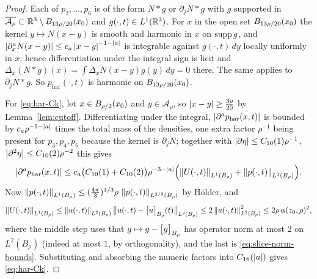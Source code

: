 \documentclass[11pt,reqno]{amsart}
\begin{document}
\begin{proof}
Each of $p_{2},\dots,p_{6}$ is of the form $N*g$ or $\partial_{j}N*g$ with $g$
supported in $\overline{\mathcal{A}_{\rho}}\subset\mathbb{R}^{3}\setminus B_{13\rho/20}(x_{0})$
and $g(\cdot,t)\in L^{1}(\mathbb{R}^{3})$. For $x$ in the open set
$B_{13\rho/20}(x_{0})$ the kernel $y\mapsto N(x-y)$ is smooth and harmonic in
$x$ on $\operatorname{supp} g$, and $\left\lvert \partial_{x}^{a}N(x-y) \right\rvert\le c_{a}\left\lvert x-y \right\rvert^{-1-\left\lvert a \right\rvert}$
is integrable against $g(\cdot,t)\,dy$ locally uniformly in $x$; hence
differentiation under the integral sign is licit and
$\Delta_{x}(N*g)(x)=\int\Delta_{x}N(x-y)g(y)\,dy=0$ there. The same applies to
$\partial_{j}N*g$. So $p_{\mathrm{har}}(\cdot,t)$ is harmonic on
$B_{13\rho/20}(x_{0})$.

For \eqref{eq:har-Ck}, let $x\in B_{\rho/2}(x_{0})$ and
$y\in\mathcal{A}_{\rho}$, so $\left\lvert x-y \right\rvert\ge\tfrac{3\rho}{20}$ by
Lemma~\ref{lem:cutoff}. Differentiating under the integral,
$\left\lvert \partial^{a}p_{\mathrm{har}}(x,t) \right\rvert$ is bounded by
$c_{a}\rho^{-1-\left\lvert a \right\rvert}$ times the total mass of the densities, one extra factor
$\rho^{-1}$ being present for $p_{3},p_{4},p_{6}$ because the kernel is
$\partial_{j}N$; together with
$\left\lvert \partial\eta \right\rvert\le C_{10}(1)\rho^{-1}$,
$\left\lvert \partial^{2}\eta \right\rvert\le C_{10}(2)\rho^{-2}$ this gives
\[
  \left\lvert \partial^{a}p_{\mathrm{har}}(x,t) \right\rvert
  \le c_{a}\bigl(C_{10}(1)+C_{10}(2)\bigr)\rho^{-3-\left\lvert a \right\rvert}
     \Bigl(\left\lVert U(\cdot,t) \right\rVert_{L^{1}(B_{\rho})}+\left\lVert p(\cdot,t) \right\rVert_{L^{1}(B_{\rho})}\Bigr).
\]
Now $\left\lVert p(\cdot,t) \right\rVert_{L^{1}(B_{\rho})}\le(\tfrac{4\pi}{3})^{1/3}\rho\,
\left\lVert p(\cdot,t) \right\rVert_{L^{3/2}(B_{\rho})}$ by H\"older, and
\[
  \left\lVert U(\cdot,t) \right\rVert_{L^{1}(B_{\rho})}
  \le\left\lVert u(\cdot,t) \right\rVert_{L^{2}(B_{\rho})}
     \bigl\|u(\cdot,t)-\bigl[u\bigr]_{B_{\rho}}(t)\bigr\|_{L^{2}(B_{\rho})}
  \le2\left\lVert u(\cdot,t) \right\rVert_{L^{2}(B_{\rho})}^{2}
  \le2\rho\,\alpha(z_{0},\rho)^{2},
\]
where the middle step uses that $g\mapsto g-\bigl[g\bigr]_{B_{\rho}}$ has operator
norm at most $2$ on $L^{2}(B_{\rho})$ (indeed at most $1$, by orthogonality), and
the last is \eqref{eq:slice-norm-bounds}. Substituting and absorbing the numeric
factors into $C_{16}(\left\lvert a \right\rvert)$ gives \eqref{eq:har-Ck}.
\end{proof}
\end{document}
